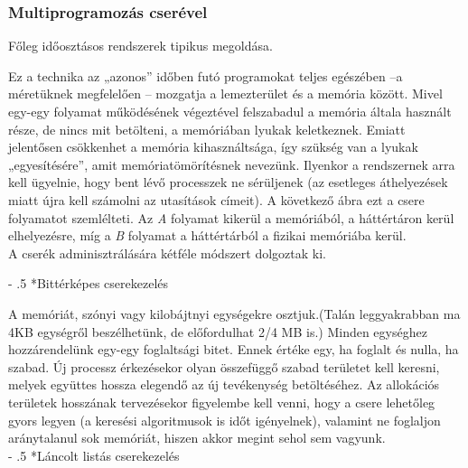 \documentclass[tikz,12pt,margin=0px]{article}
\makeatletter
\renewcommand\paragraph{%
	\@startsection{paragraph}{4}{0mm}%
	{-\baselineskip}%
	{.5\baselineskip}%
	{\normalfont\normalsize\bfseries}}
\makeatother
\begin{document}
    \subsubsection*{Multiprogramozás cserével}

    \noindent Főleg időosztásos rendszerek tipikus megoldása.

    \noindent Ez a technika az „azonos” időben futó programokat teljes egészében –a méretüknek megfelelően – mozgatja a lemezterület és a memória között. Mivel egy-egy folyamat működésének végeztével felszabadul a memória általa használt része, de nincs mit betölteni, a memóriában lyukak keletkeznek. Emiatt jelentősen csökkenhet a memória kihasználtsága, így szükség van a lyukak „egyesítésére”, amit memóriatömörítésnek nevezünk. Ilyenkor a rendszernek arra kell ügyelnie, hogy bent lévő processzek ne sérüljenek (az esetleges áthelyezések miatt újra kell számolni az utasítások címeit). A következő ábra ezt a csere folyamatot szemlélteti. Az \emph{A} folyamat kikerül a memóriából, a háttértáron kerül elhelyezésre, míg a \emph{B} folyamat a háttértárból a fizikai memóriába kerül.\\

    \noindent A cserék adminisztrálására kétféle módszert dolgoztak ki.

    \paragraph*{Bittérképes cserekezelés}

    \noindent A memóriát, szónyi vagy kilobájtnyi egységekre osztjuk.(Talán leggyakrabban ma 4KB egységről beszélhetünk, de előfordulhat 2/4 MB is.) Minden egységhez hozzárendelünk egy-egy foglaltsági bitet. Ennek értéke egy, ha foglalt és nulla, ha szabad. Új processz érkezésekor olyan összefüggő szabad területet kell keresni, melyek együttes hossza elegendő az új tevékenység betöltéséhez. Az allokációs területek hosszának tervezésekor figyelembe kell venni, hogy a csere lehetőleg gyors legyen (a keresési algoritmusok is időt igényelnek), valamint ne foglaljon aránytalanul sok memóriát, hiszen akkor megint sehol sem vagyunk.\\

    \paragraph*{Láncolt listás cserekezelés}
\end{document}
